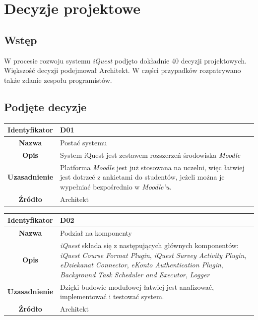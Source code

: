 \section{Decyzje projektowe}
\label{Chapter55}

\subsection{Wstęp}
\label{Chapter551}

W procesie rozwoju systemu \textit{iQuest} podjęto dokładnie 40 decyzji projektowych. Większość decyzji podejmował Architekt. W części przypadków rozpatrywano także zdanie zespołu programistów.

\subsection{Podjęte decyzje}
\label{Chapter552}

\begin{table}[H]
\centering
\begin{tabular}{ | >{\bfseries}c | p{11cm} | }
\hline
%
Identyfikator & D01 \\ \hline
Nazwa & Postać systemu \\ \hline
Opis & System iQuest jest zestawem rozszerzeń środowiska \textit{Moodle} \\ \hline
Uzasadnienie & Platforma \textit{Moodle} jest już stosowana na uczelni, więc łatwiej jest dotrzeć z ankietami do studentów, jeżeli można je wypełniać bezpośrednio w \textit{Moodle'u}. \\ \hline
Źródło & Architekt \\ \hline
%
\end{tabular}
\end{table}

\begin{table}[H]
\centering
\begin{tabular}{ | >{\bfseries}c | p{11cm} | }
\hline
%
Identyfikator & D02 \\ \hline
Nazwa & Podział na komponenty  \\ \hline
Opis & \textit{iQuest} składa się z następujących głównych komponentów: \textit{iQuest Course Format Plugin}, \textit{iQuest Survey Activity Plugin}, \textit{eDziekanat Connector}, \textit{eKonto Authentication Plugin}, \textit{Background Task Scheduler and Executor}, \textit{Logger}  \\ \hline
Uzasadnienie & Dzięki budowie modułowej łatwiej jest analizować, implementować i testować system. \\ \hline
Źródło & Architekt \\ \hline
%
\end{tabular}
\end{table}

